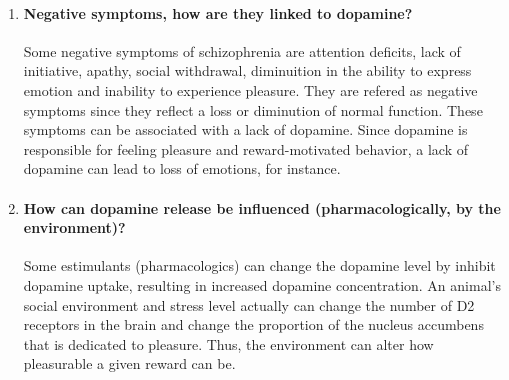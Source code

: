 \documentclass[12pt,article,oneside,a4paper]{memoir}
\begin{document}
\begin{enumerate}
\item \paragraph{Negative symptoms, how are they linked to dopamine?}
Some negative symptoms of schizophrenia are attention deficits, lack of
initiative, apathy, social withdrawal, diminuition in the ability to express
emotion and inability to experience pleasure. They are refered as negative
symptoms since they reflect a loss or diminution of normal function. These
symptoms can be associated with a lack of dopamine. Since dopamine is
responsible for feeling pleasure and reward-motivated behavior, a lack of
dopamine can lead to loss of emotions, for instance.

\item \paragraph{How can dopamine release be influenced (pharmacologically, by
the environment)?}

Some estimulants (pharmacologics) can change the dopamine level by inhibit
dopamine uptake, resulting in increased dopamine concentration. An animal's
social environment and stress level actually can change the number of D2
receptors in the brain and change the proportion of the nucleus accumbens that
is dedicated to pleasure. Thus, the environment can alter how pleasurable a
given reward can be. 

\end{enumerate}

\end{document}
